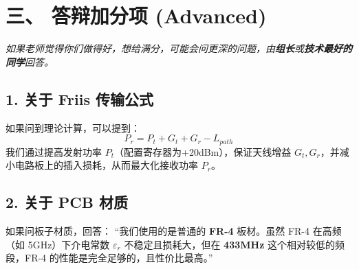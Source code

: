 \documentclass[a4paper,12pt]{ctexart}
\begin{document}
	\section{三、 答辩加分项 (Advanced)}
	\textit{如果老师觉得你们做得好，想给满分，可能会问更深的问题，由\textbf{组长}或\textbf{技术最好的同学}回答。}

	\subsection*{1. 关于 Friis 传输公式}
	如果问到理论计算，可以提到：
	$$ P_r = P_t + G_t + G_r - L_{path} $$
	我们通过提高发射功率 $P_t$（配置寄存器为+20dBm），保证天线增益 $G_t, G_r$，并减小电路板上的插入损耗，从而最大化接收功率 $P_r$。

	\subsection*{2. 关于 PCB 材质}
	如果问板子材质，回答：
	“我们使用的是普通的 \textbf{FR-4} 板材。虽然 FR-4 在高频（如 5GHz）下介电常数 $\varepsilon_r$ 不稳定且损耗大，但在 \textbf{433MHz} 这个相对较低的频段，FR-4 的性能是完全足够的，且性价比最高。”
\end{document}

